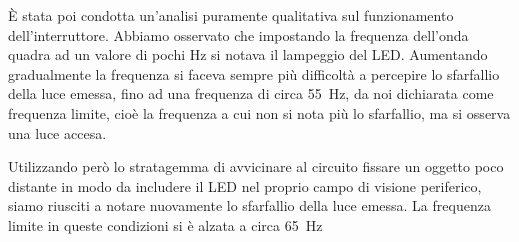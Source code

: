 È stata poi condotta un'analisi puramente qualitativa sul funzionamento dell'interruttore. Abbiamo osservato che impostando la frequenza dell'onda quadra ad un valore di pochi \si{\hertz} si notava il lampeggio del LED. Aumentando gradualmente la frequenza si faceva sempre più difficoltà a percepire lo sfarfallio della luce emessa, fino ad una frequenza di circa \SI{55}{\hertz}, da noi dichiarata come frequenza limite, cioè la frequenza a cui non si nota più lo sfarfallio, ma si osserva una luce accesa.

Utilizzando però lo stratagemma di avvicinare al circuito fissare un oggetto poco distante in modo da includere il LED nel proprio campo di visione periferico, siamo riusciti a notare nuovamente lo sfarfallio della luce emessa. La frequenza limite in queste condizioni si è alzata a circa \SI{65}{\hertz}